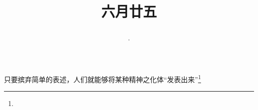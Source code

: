 \title{\date[d=30,m=7,y=2024][year:cn-y,年,month:cn,day:cn,日,·,weekday]·六月廿五 }
只要摈弃简单的表述，人们就能够将某种精神之化体“发表出来”\footnote{ }

